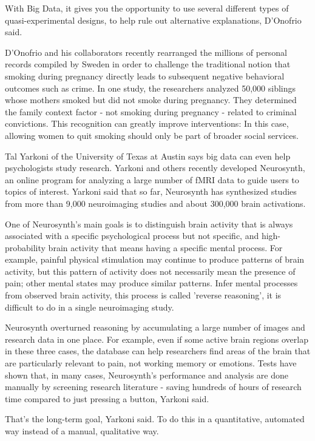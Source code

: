 With Big Data, it gives you the opportunity to use several different 
types of quasi-experimental designs, to help rule out alternative 
explanations, D’Onofrio said\cite{editor01}.

D'Onofrio and his collaborators recently rearranged the millions of personal records compiled by Sweden in order to challenge the traditional notion that smoking during pregnancy directly leads to subsequent negative behavioral outcomes such as crime. In one study, the researchers analyzed 50,000 siblings whose mothers smoked but did not smoke during pregnancy. They determined the family context factor - not smoking during pregnancy - related to criminal convictions. This recognition can greatly improve interventions: In this case, allowing women to quit smoking should only be part of broader social services.

Tal Yarkoni of the University of Texas at Austin says big data can 
even help psychologists study research. Yarkoni and others recently 
developed Neurosynth, an online program for analyzing a large number 
of fMRI data to guide users to topics of interest. Yarkoni said that 
so far, Neurosynth has synthesized studies from more than 9,000 
neuroimaging studies and about 300,000 brain activations.

One of Neurosynth's main goals is to distinguish brain activity that 
is always associated with a specific psychological process but not 
specific, and high-probability brain activity that means having a 
specific mental process. For example, painful physical stimulation 
may continue to produce patterns of brain activity, but this pattern 
of activity does not necessarily mean the presence of pain; other 
mental states may produce similar patterns. Infer mental processes 
from observed brain activity, this process is called 'reverse 
reasoning', it is difficult to do in a single neuroimaging study.

Neurosynth overturned reasoning by accumulating a large number of 
images and research data in one place. For example, even if some 
active brain regions overlap in these three cases, the database can 
help researchers find areas of the brain that are particularly relevant 
to pain, not working memory or emotions. Tests have shown that, in many 
cases, Neurosynth's performance and analysis are done manually by 
screening research literature - saving hundreds of hours of research 
time compared to just pressing a button, Yarkoni said.

That’s the long-term goal, Yarkoni said. To do this in a quantitative, 
automated way instead of a manual, qualitative way\cite{editor01}.

